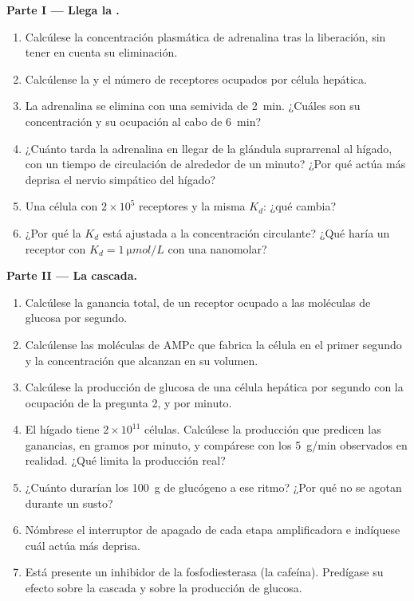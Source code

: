 \begin{problem}
\medskip
\noindent\textbf{Parte I --- Llega la .}
\begin{enumerate}
  \item Calcúlese la concentración plasmática de adrenalina tras la
        liberación, sin tener en cuenta su eliminación.
  \item Calcúlense la  y el número de
        receptores ocupados por célula hepática.
  \item La adrenalina se elimina con una semivida de \qty{2}{min}. ¿Cuáles
        son su concentración y su ocupación al cabo de \qty{6}{min}?
  \item ¿Cuánto tarda la adrenalina en llegar de la glándula suprarrenal
        al hígado, con un tiempo de circulación de alrededor de un minuto?
        ¿Por qué actúa más deprisa el nervio simpático del hígado?
  \item Una célula con $2\times 10^{5}$ receptores y la misma $K_d$:
        ¿qué cambia?
  \item ¿Por qué la $K_d$ está ajustada a la concentración circulante?
        ¿Qué haría un receptor con $K_d = \qty{1}{\micro mol/L}$ con una
         nanomolar?
\end{enumerate}

\medskip
\noindent\textbf{Parte II --- La cascada.}
\begin{enumerate}[resume]
  \item Calcúlese la ganancia total, de un receptor ocupado a las
        moléculas de glucosa por segundo.
  \item Calcúlense las moléculas de AMPc que fabrica la célula en el
        primer segundo y la concentración que alcanzan en su volumen.
  \item Calcúlese la producción de glucosa de una célula hepática por
        segundo con la ocupación de la pregunta 2, y por minuto.
  \item El hígado tiene $2\times 10^{11}$ células. Calcúlese la producción
        que predicen las ganancias, en gramos por minuto, y compárese con
        los \qty{5}{g/min} observados en realidad. ¿Qué limita la
        producción real?
  \item ¿Cuánto durarían los \qty{100}{g} de glucógeno a ese ritmo?
        ¿Por qué no se agotan durante un susto?
  \item Nómbrese el interruptor de apagado de cada etapa amplificadora e
        indíquese cuál actúa más deprisa.
  \item Está presente un inhibidor de la fosfodiesterasa (la cafeína).
        Predígase su efecto sobre la cascada y sobre la producción de
        glucosa.
\end{enumerate}


\end{problem}
